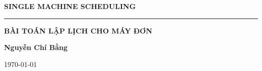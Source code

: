 \documentclass[12pt,a4paper]{report}
\begin{document}
 
    \begin{titlepage}
	\centering
    \phantom{}\par
	\vspace{3cm}
	{\LARGE\textbf{SINGLE MACHINE SCHEDULING}\par}
	\vspace{1cm}
	\rule{5cm}{0.5pt}\par
	\vspace{1cm}
		{\LARGE\textbf{BÀI TOÁN LẬP LỊCH CHO MÁY ĐƠN}\par}
	\vspace{1cm}
	\Large\textbf{Nguyễn Chí Bằng}\par		
	\vspace{1cm}
    \today
    \end{titlepage}

	\tableofcontents
\end{document}
